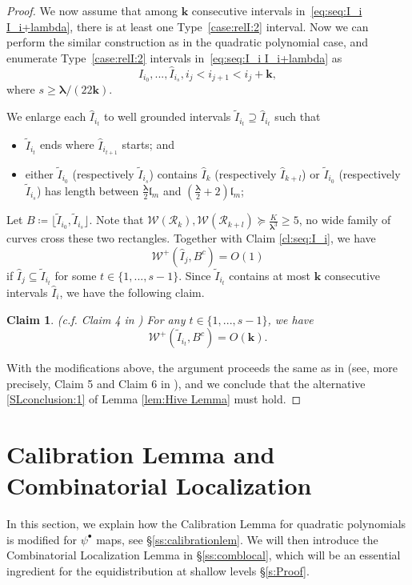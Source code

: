 \documentclass{amsart}
\newcommand{\1}{{\mathbb 1 }}
\newcommand{\blambda}{{\boldsymbol\lambda}}
\newcommand{\Width}{{\mathcal W}}
\newcommand{\wI}{{\widehat I}}
\newcommand{\length}{{\mathfrak l}}
\newtheorem{claim}{Claim}
\theoremstyle{remark}
\numberwithin{equation}{section}
\theoremstyle{definition}
\begin{document}
\begin{proof}
We now assume that among $\mathbf{k}$ consecutive intervals in~\eqref{eq:seq:I_i  I_i+lambda}, there is at least one Type~\eqref{case:relI:2} interval.
Now we can perform the similar construction as in the quadratic polynomial case, and enumerate Type~\eqref{case:relI:2} intervals in~\eqref{eq:seq:I_i  I_i+lambda} as
$$
\wI_{i_0},..., \wI_{i_{s}}, i_j < i_{j+1} < i_j + \mathbf{k},
$$
where $s \geq \blambda/(22\mathbf{k})$.

We enlarge each $\wI_{i_t}$ to well grounded intervals $\widetilde I_{i_t} \supseteq \wI_{i_t}$ such that
\begin{itemize}
    \item $\widetilde I_{i_t}$ ends where $\wI_{i_{t+1}}$ starts; and
    \item either $\widetilde I_{i_0}$ (respectively $\widetilde I_{i_s}$) contains $\wI_k$ (respectively $\wI_{k+l}$) or $\widetilde I_{i_0}$ (respectively $\widetilde I_{i_s}$) has length between $\frac{\blambda}{2} \length_m$ and $(\frac{\blambda}{2} +2) \length_m$;
\end{itemize}

Let $B\coloneqq \lfloor \widetilde I_{i_0}, \widetilde I_{i_s}\rfloor$.
Note that $\Width(\mathcal{R}_k), \Width(\mathcal{R}_{k+l}) \succeq \frac{K}{\blambda^3} \geq 5$, no wide family of curves cross these two rectangles.
Together with Claim \ref{cl:seq:I_i}, we have
$$
\Width^+(\wI_j, B^c) = O(1)
$$
if $\wI_j \subseteq \widetilde I_{i_t}$ for some $t \in \{1,..., s-1\}$.
Since $\widetilde I_{i_t}$ contains at most $\mathbf{k}$ consecutive intervals $\wI_i$,
we have the following claim.
\begin{claim}(c.f. Claim 4 in \cite[\S 8.2]{DL22})
For any $t \in \{1,..., s-1\}$, we have
$$
\Width^+(\widetilde I_{i_t}, B^c) = O(\mathbf{k}).
$$
\end{claim}

With the modifications above, the argument proceeds the same as in \cite[Lemma 8.6]{DL22} (see, more precisely, Claim 5 and Claim 6 in \cite[\S 8.2]{DL22}), and we conclude that the alternative \ref{SLconclusion:1} of Lemma \ref{lem:Hive Lemma} must hold.
\end{proof}


\section{Calibration Lemma and Combinatorial Localization}\label{sec:calibration}
In this section, we explain how the Calibration Lemma \cite{DL22} for quadratic polynomials is modified for $\psi^\bullet$ maps, see \S\ref{ss:calibrationlem}. We will then introduce the Combinatorial Localization Lemma in \S\ref{ss:comblocal}, which will be an essential ingredient for the equidistribution at shallow levels \S\ref{s:Proof}.
\end{document}
